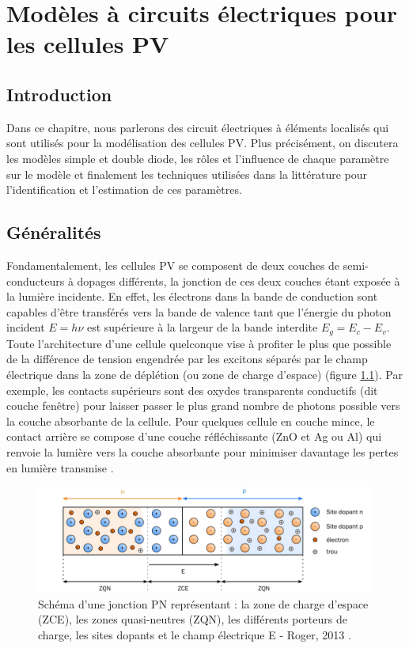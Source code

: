 \chapter{Modèles à circuits électriques pour les cellules PV}

\section{Introduction}
Dans ce chapitre, nous parlerons des circuit électriques à éléments localisés qui sont utilisés pour la modélisation des cellules PV. Plus précisément, on discutera les modèles simple et double diode, les rôles et l'influence de chaque paramètre sur le modèle et finalement les techniques utilisées dans la littérature pour l'identification et l'estimation de ces paramètres.

\section{Généralités}

Fondamentalement, les cellules PV se composent de deux couches de semi-conducteurs à dopages différents, la jonction de ces deux couches étant exposée à la lumière incidente. En effet, les électrons dans la bande de conduction sont capables d'être transférés vers la bande de valence tant que l'énergie du photon incident $E = h \nu$ est supérieure à la largeur de la bande interdite $E_g = E_c - E_v$. Toute l'architecture d'une cellule quelconque vise à profiter le plus que possible de la différence de tension engendrée par les excitons séparés par le champ électrique dans la zone de déplétion (ou zone de charge d'espace) (figure \ref{fig:pn}). Par exemple, les contacts supérieurs sont des oxydes transparents conductifs (dit couche fenêtre) pour laisser passer le plus grand nombre de photons possible vers la couche absorbante de la cellule. Pour quelques cellule en couche mince, le contact arrière se compose d'une couche réfléchissante (ZnO et Ag ou Al) qui renvoie la lumière vers la couche absorbante pour minimiser davantage les pertes en lumière transmise \cite{Chopra2004}.

\begin{figure}
  \begin{center}
    \includegraphics[width=.7\textwidth]{resources/pn.PNG}
    \caption{Schéma d'une jonction PN représentant : la zone de charge d'espace
(ZCE), les zones quasi-neutres (ZQN), les différents porteurs de charge, les sites dopants et le champ électrique E - Roger, 2013 \cite{Roger2013}.}
    \label{fig:pn}
  \end{center}
\end{figure}  

